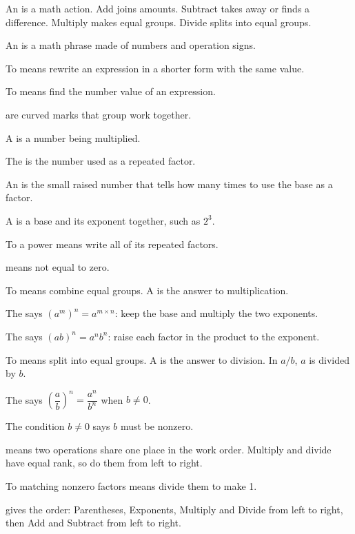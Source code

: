 \begin{words}
  \item An is a math action. Add joins amounts. Subtract takes
    away or finds a difference. Multiply makes equal groups. Divide splits into
    equal groups.
  \item An is a math phrase made of numbers and operation signs.
  \item To means rewrite an expression in a shorter form with the
    same value.
  \item To means find the number value of an expression.
  \item {}are curved marks that group work together.
  \item A is a number being multiplied.
  \item The is the number used as a repeated factor.
  \item An is the small raised number that tells how many times to
    use the base as a factor.
  \item A is a base and its exponent together, such as $2^{3}$.
  \item To a power means write all of its repeated factors.
  \item {}means not equal to zero.
  \item To means combine equal groups. A is the
    answer to multiplication.
  \item The says $(a^{m})^{n} = a^{m \times n}$: keep
    the base and multiply the two exponents.
  \item The says $(ab)^{n} = a^{n}b^{n}$: raise each
    factor in the product to the exponent.
  \item To means split into equal groups. A is the
    answer to division. In $a/b$, $a$ is divided by $b$.
  \item The says
    $\left(\dfrac{a}{b}\right)^{n} = \dfrac{a^{n}}{b^{n}}$ when $b \neq 0$.
  \item The condition $b \neq 0$ says $b$ must be nonzero.
  \item {}means two operations share one place in the work order.
    Multiply and divide have equal rank, so do them from left to right.
  \item To matching nonzero factors means divide them to make 1.
  \item {}gives the order: Parentheses, Exponents, Multiply and Divide
    from left to right, then Add and Subtract from left to right.
\end{words}

